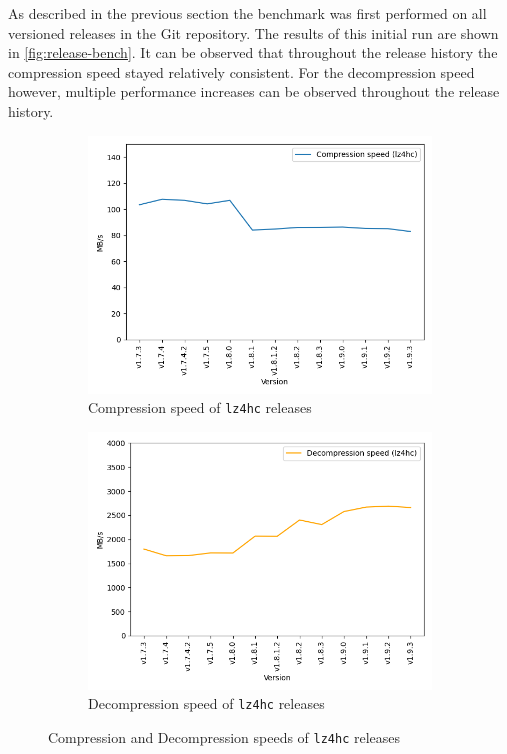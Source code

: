 \documentclass[	runningheads,
				a4paper]{llncs}
\begin{document}
	As described in the previous section the benchmark was first performed on all versioned releases in the Git repository. The results of this initial run are shown in \autoref{fig:release-bench}. It can be observed that throughout the release history the compression speed stayed relatively consistent. For the decompression speed however, multiple performance increases can be observed throughout the release history. 

	\begin{figure}[ht!]
		\centering
		\begin{subfigure}[b]{0.45\textwidth}
			\centering
			\includegraphics[width=\textwidth]{graph/lz4hc_release_compression}
			\caption{Compression speed of \texttt{lz4hc} releases}
		\end{subfigure}
		\begin{subfigure}[b]{0.45\textwidth}
			\centering
			\includegraphics[width=\textwidth]{graph/lz4hc_release_decompression}
			\caption{Decompression speed of \texttt{lz4hc} releases}
		\end{subfigure}
		\caption{Compression and Decompression speeds of \texttt{lz4hc} releases}
		\label{fig:release-bench-lz4hc}
	\end{figure}
\end{document}
